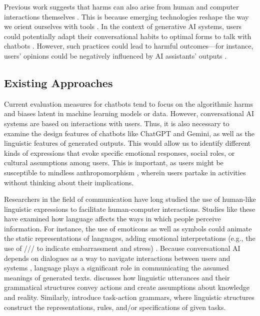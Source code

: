 Previous work suggests that harms can also arise from human and computer interactions themselves \cite{gabriel2024ethics, weidinger2022taxonomy}. This is because emerging technologies reshape the way we orient ourselves with tools \citep{turkle2017computers}. In the context of generative AI systems, users could potentially adapt their conversational habits to optimal forms to talk with chatbots \cite{hancock2020ai}. However, such practices could lead to harmful outcomes---for instance, users' opinions could be negatively influenced by AI assistants' outputs \citep{jakesch2023co}. 

\subsection{Existing Approaches}

Current evaluation measures for chatbots tend to focus on the algorithmic harms and biases latent in machine learning models or data. However, conversational AI systems are based on interactions with users. Thus, it is also necessary to examine the design features of chatbots like ChatGPT and Gemini, as well as the linguistic features of generated outputs. This would allow us to identify different kinds of expressions that evoke specific emotional responses, social roles, or cultural assumptions among users. This is important, as users might be susceptible to mindless anthropomorphism \citep{kim2012anthropomorphism,araujo2018living}, wherein users partake in activities without thinking about their implications.

Researchers in the field of communication have long studied the use of human-like linguistic expressions to facilitate human-computer interactions. Studies like these have examined how language affects the ways in which people perceive information. For instance, the use of emoticons as well as symbols could animate the static representations of languages, adding emotional interpretations (e.g., the use of /// to indicate embarrassment and stress) \citep{silvio2010animation}. Because conversational AI depends on dialogues as a way to navigate interactions between users and systems \citep{reisner1981formal}, language plays a significant role in communicating the assumed meanings of generated texts. \citet{agre1995computational}discusses how linguistic utterances and their grammatical structures convey actions and create assumptions about knowledge and reality. Similarly, \citet{payne1986task} introduce task-action grammars, where linguistic structures construct the representations, rules, and/or specifications of given tasks.

